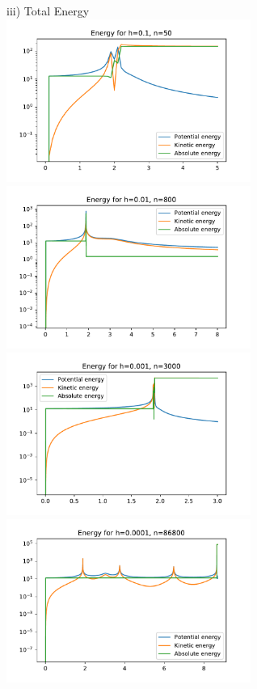 \documentclass[12pt,a4paper]{article}
\begin{document}
\newpage
iii) Total Energy \\
\includegraphics[width=8cm]{energ_h_1.pdf}
\includegraphics[width=8cm]{energ_h_01.pdf}\\
\includegraphics[width=8cm]{energ_h_001.pdf}
\includegraphics[width=8cm]{energ_h_0001.pdf}\\
\end{document}
